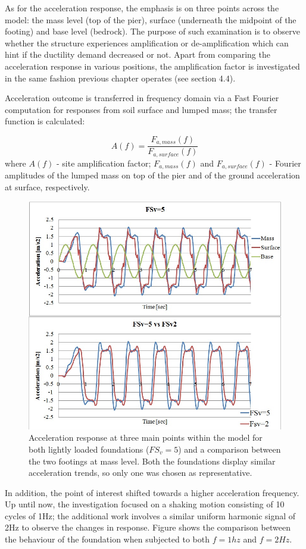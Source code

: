 As for the acceleration response, the emphasis is on three points across the model: the mass level (top of the pier), surface (underneath the midpoint of the footing) and base level (bedrock). The purpose of such examination is to observe whether the structure experiences amplification or de-amplification which can hint if the ductility demand decreased or not. Apart from comparing the acceleration response in various positions, the amplification factor is investigated in the same fashion previous chapter operates (see section 4.4).

Acceleration outcome is transferred in frequency domain via a Fast Fourier \mbox{computation} for responses from soil surface and lumped mass; the transfer function is calculated:

\begin{equation}
A(f)=\frac{F_{a,mass}(f)}{F_{a,surface}(f)}
\end{equation}
where $A(f)$ - site amplification factor; $F_{a,mass}(f)$ and $F_{a,surface}(f)$ - Fourier amplitudes of the lumped mass on top of the pier and of the ground acceleration at surface, respectively. 

\begin{figure}[!h]
	\centering
	\includegraphics[width=0.55\linewidth]{"acc_sin4m2"}
	\caption{Acceleration response at three main points within the model for both lightly loaded foundations ($FS_v=5$) and a comparison between the two footings at mass level. Both the foundations display similar acceleration trends, so only one was chosen as representative.}
	\label{acc4msin}
\end{figure}

In addition, the point of interest shifted towards a higher acceleration frequency. Up until now, the investigation focused on a shaking motion consisting of 10 cycles of 1Hz; the additional work involves a similar uniform harmonic signal of 2Hz to observe the changes in response. Figure shows the comparison between the behaviour of the foundation when subjected to both $f=1hz$ and $f=2Hz$.

